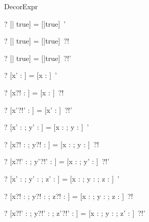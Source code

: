 \begin{zsection}
  \SECTION DecorExpr
\end{zsection}

\begin{zed} \vdash? [| true] = [|true]~' \end{zed}
\begin{zed} \vdash? [| true] = [|true]~?! \end{zed}
\begin{zed} \vdash? [| true] = [|true]~?!' \end{zed}

\begin{zed} \vdash? [x' : \nat] = [x : \nat]~' \end{zed}
\begin{zed} \vdash? [x?! : \nat] = [x : \nat]~?! \end{zed}
\begin{zed} \vdash? [x'?!' : \nat] = [x' : \nat]~?!' \end{zed}

\begin{zed} \vdash? [x' : \nat; y' : \nat] = [x : \nat; y : \nat]~' \end{zed}
\begin{zed} 
  \vdash? [x?! : \nat; y?! : \nat] =  [x : \nat; y : \nat]~?!
\end{zed}
\begin{zed} 
  \vdash? [x?!' : \nat; y'?!' : \nat] =  [x : \nat; y' : \nat]~?!'
\end{zed}


\begin{zed}
  \vdash? [x' : \nat; y' : \nat; z' : \power \nat] = 
          [x : \nat; y : \nat; z : \power \nat]~'
\end{zed}
\begin{zed}
  \vdash? [x?! : \nat; y?! : \nat; z?! : \power \nat] = 
          [x : \nat; y : \nat; z : \power \nat]~?!
\end{zed}
\begin{zed}
  \vdash? [x?!' : \nat; y?!' : \nat; z'?!' : \power \nat] = 
          [x : \nat; y : \nat; z' : \power \nat]~?!'
\end{zed}

